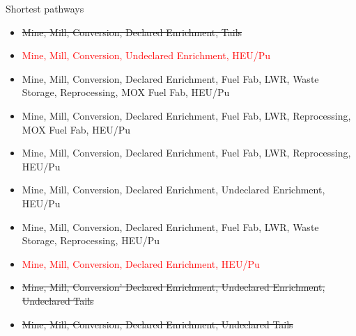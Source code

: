 \begin{frame}{Shortest pathways}
    \begin{itemize}
        \item \st{Mine, Mill, Conversion, Declared Enrichment, Tails}
        \item \textcolor{red}{Mine, Mill, Conversion, Undeclared Enrichment, HEU/Pu}
        \item Mine, Mill, Conversion, Declared Enrichment, Fuel Fab, LWR, Waste Storage, Reprocessing, MOX Fuel Fab, HEU/Pu
        \item Mine, Mill, Conversion, Declared Enrichment, Fuel Fab, LWR, Reprocessing, MOX Fuel Fab, HEU/Pu
        \item Mine, Mill, Conversion, Declared Enrichment, Fuel Fab, LWR, Reprocessing, HEU/Pu
        \item Mine, Mill, Conversion, Declared Enrichment, Undeclared Enrichment, HEU/Pu
        \item Mine, Mill, Conversion, Declared Enrichment, Fuel Fab, LWR, Waste Storage, Reprocessing, HEU/Pu
        \item \textcolor{red}{Mine, Mill, Conversion, Declared Enrichment, HEU/Pu}
        \item \st{Mine, Mill, Conversion' Declared Enrichment, Undeclared Enrichment, Undeclared Tails}
        \item \st{Mine, Mill, Conversion, Declared Enrichment, Undeclared Tails}
    \end{itemize}
\end{frame}


